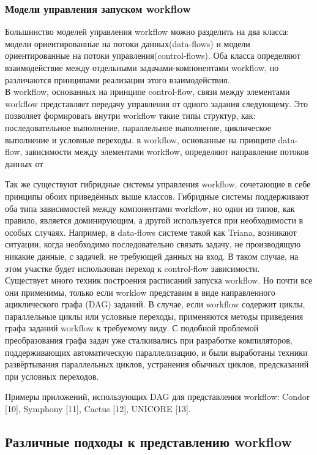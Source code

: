 \documentclass[koi8-r,usehyperref,12pt]{G7-32}
\begin{document}
\subsubsection{Модели управления запуском workflow}
  Большинство моделей управления workflow можно разделить на два класса: модели ориентированные на потоки данных(data-flows) и модели ориентированные на потоки управления(control-flows). Оба класса определяют взаимодействие между отдельными задачами-компонентами workflow, но различаются принципами реализации этого взаимодействия.  \\
  В workflow, основанных на принципе control-flow, связи между элементами workflow  представляет передачу управления от одного задания следующему. Это позволяет формировать внутри workflow такие типы структур, как: последовательное выполнение, параллельное выполнение, циклическое выполнение и условные переходы. в workflow, основанные на принципе data-flow, зависимости между элементами workflow, определяют направление потоков данных от 
  
  Так же существуют гибридные системы управления workflow, сочетающие в себе принципы обоих приведённых выше классов. Гибридные системы поддерживают оба типа зависимостей между компонентами workflow, но  один из типов, как правило, является доминирующим, а другой используется при необходимости  в особых случаях. Например, в data-flows системе такой как Triana, возникают ситуации, когда необходимо последовательно связать задачу, не производящую никакие данные, с задачей, не  требующей данных на вход. В таком случае, на этом участке будет использован переход к control-flow зависимости.\\
 
 
Существует много техник построения расписаний запуска workflow. Но почти все они применимы, только если worklow представим в виде направленного ациклического графа (DAG) заданий. В случае, если workflow содержит циклы, параллельные циклы или условные переходы, применяются методы приведения графа заданий workflow к требуемому виду. С подобной проблемой преобразования графа задач уже сталкивались при разработке компиляторов, поддерживающих автоматическую параллелизацию, и были выработаны техники развёртывания параллельных циклов, устранения обычных циклов, предсказаний при условных переходов.

Примеры приложений, использующих DAG для представления workflow: Condor [10], Symphony [11], Cactus [12], UNICORE [13].


\subsection{Различные подходы к представлению workflow}
\end{document}
